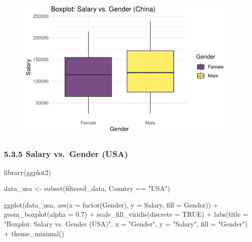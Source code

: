 \documentclass[
  letterpaper,
  DIV=11,
  numbers=noendperiod]{scrartcl}
\newenvironment{Shaded}{\begin{snugshade}}{\end{snugshade}}
\newcommand{\AttributeTok}[1]{\textcolor[rgb]{0.40,0.45,0.13}{#1}}
\newcommand{\ConstantTok}[1]{\textcolor[rgb]{0.56,0.35,0.01}{#1}}
\newcommand{\FloatTok}[1]{\textcolor[rgb]{0.68,0.00,0.00}{#1}}
\newcommand{\FunctionTok}[1]{\textcolor[rgb]{0.28,0.35,0.67}{#1}}
\newcommand{\NormalTok}[1]{\textcolor[rgb]{0.00,0.23,0.31}{#1}}
\newcommand{\OtherTok}[1]{\textcolor[rgb]{0.00,0.23,0.31}{#1}}
\newcommand{\SpecialCharTok}[1]{\textcolor[rgb]{0.37,0.37,0.37}{#1}}
\newcommand{\StringTok}[1]{\textcolor[rgb]{0.13,0.47,0.30}{#1}}
\begin{document}
\begin{figure}[H]

{\centering \includegraphics{main_doc_files/figure-pdf/unnamed-chunk-56-1.pdf}

}

\end{figure}

\hypertarget{salary-vs.-gender-usa}{%
\subsubsection{5.3.5 Salary vs.~Gender
(USA)}\label{salary-vs.-gender-usa}}

\begin{Shaded}
\begin{Highlighting}[]
\FunctionTok{library}\NormalTok{(ggplot2)}

\NormalTok{data\_usa }\OtherTok{\textless{}{-}} \FunctionTok{subset}\NormalTok{(filtered\_data, Country }\SpecialCharTok{==} \StringTok{"USA"}\NormalTok{)}

\FunctionTok{ggplot}\NormalTok{(data\_usa, }\FunctionTok{aes}\NormalTok{(}\AttributeTok{x =} \FunctionTok{factor}\NormalTok{(Gender), }\AttributeTok{y =}\NormalTok{ Salary, }\AttributeTok{fill =}\NormalTok{ Gender)) }\SpecialCharTok{+}
  \FunctionTok{geom\_boxplot}\NormalTok{(}\AttributeTok{alpha =} \FloatTok{0.7}\NormalTok{) }\SpecialCharTok{+}
  \FunctionTok{scale\_fill\_viridis}\NormalTok{(}\AttributeTok{discrete =} \ConstantTok{TRUE}\NormalTok{) }\SpecialCharTok{+}
  \FunctionTok{labs}\NormalTok{(}\AttributeTok{title =} \StringTok{"Boxplot: Salary vs. Gender (USA)"}\NormalTok{,}
       \AttributeTok{x =} \StringTok{"Gender"}\NormalTok{,}
       \AttributeTok{y =} \StringTok{"Salary"}\NormalTok{,}
       \AttributeTok{fill =} \StringTok{"Gender"}\NormalTok{) }\SpecialCharTok{+}
  \FunctionTok{theme\_minimal}\NormalTok{()}
\end{Highlighting}
\end{Shaded}
\end{document}
